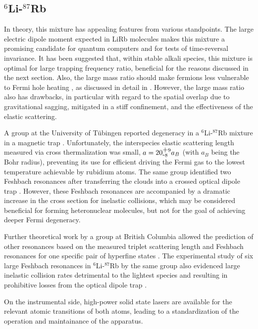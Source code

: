 \documentclass[pra,letterpaper,twocolumn,showpacs,superscriptaddress]{revtex4}
\begin{document}
\subsection{\bf{${}^6$Li-${}^{87}$Rb}}

In theory, this mixture has appealing features from various standpoints. The large electric dipole moment expected 
in LiRb molecules makes this mixture a promising candidate for quantum computers and for tests of time-reversal invariance.
It has been suggested that, within stable alkali species, this mixture is optimal for large trapping frequency ratio, beneficial for the 
reasons discussed in the next section. Also, the large mass ratio should make fermions less vulnerable to Fermi hole heating 
\cite{Timmermans2001}, as discussed in detail in \cite{Cote2005}. However, the large mass ratio also has drawbacks, in particular with regard to the spatial 
overlap due to gravitational sagging, mitigated in a stiff confinement, and the effectiveness of the elastic scattering.

A group at the University of T\"ubingen reported degeneracy in a ${}^6$Li-${}^{87}$Rb mixture in a magnetic trap \cite{Silber2005}. 
Unfortunately, the interspecies elastic scattering length measured via cross thermalization was small, $a=20^{\mbox +9}_{\mbox -8} a_B$ 
(with $a_B$ being the Bohr radius), preventing its use for efficient driving the Fermi gas to the lowest temperature achievable by rubidium atoms. 
The same group identified two Feshbach resonances after transferring the clouds into a crossed optical dipole trap \cite{Deh2008}. 
However, these Feshbach resonances are accompanied by a dramatic increase in the cross section for inelastic collisions, which 
may be considered beneficial for forming heteronuclear molecules, but not for the goal of achieving deeper Fermi degeneracy. 

Further theoretical work by a group at British Columbia allowed the prediction of other resonances based on the measured triplet 
scattering length and Feshbach resonances for one specific pair of hyperfine states \cite{Li2008}. The experimental study of  
six large Feshbach resonances in ${}^{6}$Li-${}^{87}$Rb by the same group also evidenced large inelastic collision rates 
detrimental to the lightest species and resulting in prohibitive losses from the optical dipole trap \cite{Deh2010}. 

On the instrumental side, high-power solid state lasers are available for the relevant atomic transitions of both atoms, leading to a 
standardization of the operation and maintainance of the apparatus. 
\end{document}
